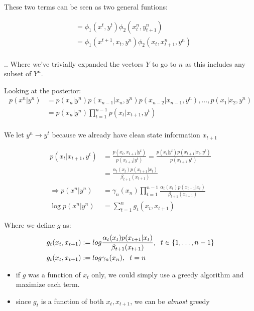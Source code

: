 \documentclass{article}
\begin{document}
These two terms can be seen as two general funtions:

\begin{align*}
&= \phi_1(x^t, y^t)\phi_2(x_{t}^{n}, y_{t+1}^{n})\\
&= \phi_1(x^{t+1}, x_t, y^n) \phi_2(x_t, x_{t+1}^{n}, y^n)\\
\end{align*}

.. Where we've trivially expanded the vectors $Y$ to go to $n$ as this includes any subset of $Y^n$.  

Looking at the posterior:
\begin{align*}
p(x^n | y^n) &= p(x_n | y^n) p(x_{n-1} | x_n, y^n)p(x_{n-2} | x_{n-1}, y^n),\dots, p(x_1 | x_2, y^n)\\
&= p(x_n | y^n) \prod_{t=1}^{n-1}p(x_t | x_{t+1}, y^t)\\
\end{align*}

We let $y^n \rightarrow y^t$ because we already have clean state information $x_{t+1}$

\begin{align*}
p(x_t | x_{t+1}, y^t) &= \frac{p(x_t , x_{t+1} | y^t)}{p(x_{t+1} | y^t)} = \frac{p(x_t | y^t) p(x_{t+1} | x_t , y^t)}{p(x_{t+1} | y^t)}\\
&= \frac{\alpha_t (x_t) p(x_{t+1} | x_t)}{\beta_{t+1}(x_{t+1})}\\
\Rightarrow p(x^n | y^n) &= \gamma_n (x_n) \prod_{t=1}^{n-1} \frac{\alpha_t (x_t) p(x_{t+1} | x_t)}{\beta_{t+1} (x_{t+1})}\\
\log p(x^n | y^n) &= \sum_{t = 1}^{n} g_t (x_t, x_{t+1})
\end{align*}

Where  we define $g$ as:
\begin{align*}
g_t(x_t, x_{t+1}) &:= log \frac{\alpha_t (x_t) p(x_{t+1} | x_t)}{\beta_{t+1}(x_{t+1})}, \hspace{2 mm} t \in \{1, \dots , n-1\}\\
g_t(x_t, x_{t+1}) &:= log \gamma_n (x_n), \hspace{2 mm } t = n
\end{align*}	

\begin{itemize}
	\item  if $g$ was a function of $x_t$ only, we could simply use a greedy algorithm and maximize each term.
	\item since $g_t$ is a function of both $x_t, x_{t+1}$, we can be \textit{almost} greedy
\end{itemize}
\end{document}
